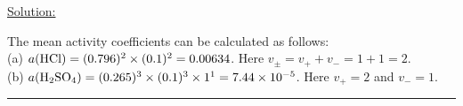 \noindent
\underline{Solution:}

The mean activity coefficients can be calculated as follows:\\
(a) $a(\textnormal{HCl}) = (0.796)^2\times(0.1)^2 = 0.00634$. Here $v_\pm = v_+ + v_- = 1 + 1 = 2$.\\
(b) $a(\textnormal{H}_2\textnormal{SO}_4) = (0.265)^3\times(0.1)^3\times 1^1 = 7.44\times 10^{-5}$. Here $v_+ = 2$ and $v_- = 1$.

\hrule\vspace{0.5cm}
